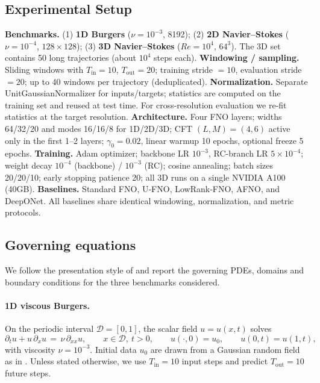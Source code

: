 \documentclass[11pt]{article}
\begin{document}
\subsection{Experimental Setup}

\textbf{Benchmarks.} (1) \textbf{1D Burgers} ($\nu = 10^{-3}$, 8192); (2) \textbf{2D Navier–Stokes} ($\nu = 10^{-4}$, $128\times128$); (3) \textbf{3D Navier–Stokes} ($Re=10^4$, $64^3$). The 3D set contains 50 long trajectories (about $10^4$ steps each).
\textbf{Windowing / sampling.} Sliding windows with $T_{\mathrm{in}}=10$, $T_{\mathrm{out}}=20$; training stride $=10$, evaluation stride $=20$; up to 40 windows per trajectory (deduplicated).
\textbf{Normalization.} Separate UnitGaussianNormalizer for inputs/targets; statistics are computed on the training set and reused at test time. For cross-resolution evaluation we re-fit statistics at the target resolution.
\textbf{Architecture.} Four FNO layers; widths 64/32/20 and modes 16/16/8 for 1D/2D/3D; CFT $(L,M)=(4,6)$ active only in the first 1–2 layers; $\gamma_0=0.02$, linear warmup 10 epochs, optional freeze 5 epochs.
\textbf{Training.} Adam optimizer; backbone LR $10^{-3}$, RC-branch LR $5\times10^{-4}$; weight decay $10^{-4}$ (backbone) / $10^{-3}$ (RC); cosine annealing; batch sizes 20/20/10; early stopping patience 20; all 3D runs on a single NVIDIA A100 (40GB).
\textbf{Baselines.} Standard FNO, U‑FNO, LowRank‑FNO, AFNO, and DeepONet. All baselines share identical windowing, normalization, and metric protocols.

\subsection{Governing equations}

We follow the presentation style of \citet{Li2020FNO} and report the governing PDEs, domains and boundary conditions for the three benchmarks considered.

\paragraph{1D viscous Burgers.} On the periodic interval $\mathcal{D}=[0,1]$, the scalar field $u=u(x,t)$ solves
\begin{equation}
\partial_t u + u\,\partial_x u \,=\, \nu\,\partial_{xx} u,\qquad x\in\mathcal{D},\ t>0,\qquad u(\cdot,0)=u_0,\qquad u(0,t)=u(1,t),
\end{equation}
with viscosity $\nu=10^{-3}$. Initial data $u_0$ are drawn from a Gaussian random field as in \citet{Li2020FNO}. Unless stated otherwise, we use $T_{\mathrm{in}}=10$ input steps and predict $T_{\mathrm{out}}=10$ future steps.
\end{document}
